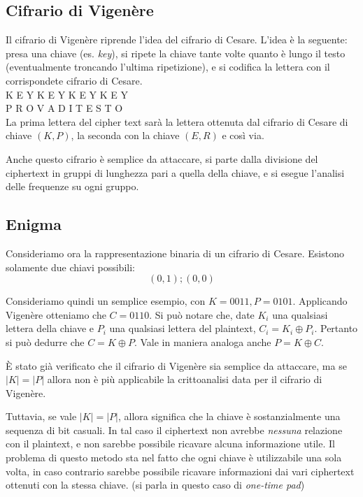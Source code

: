 \documentclass[a4paper, 11pt]{article}
\begin{document}
	\subsection{Cifrario di Vigenère}
	Il cifrario di Vigenère riprende l'idea del cifrario di Cesare. L'idea è la seguente: presa una chiave (es. \textit{key}), si ripete la chiave tante volte quanto è lungo il testo (eventualmente troncando l'ultima ripetizione), e si codifica la lettera con il corrispondete cifrario di Cesare. \\
	
	\noindent
	K E Y K E Y K E Y K E Y \\
	P R O V A D I T E S T O \\
	
	
	La prima lettera del cipher text sarà la lettera ottenuta dal cifrario di Cesare di chiave $(K,P)$, la seconda con la chiave $(E, R)$ e così via.
	
	Anche questo cifrario è semplice da attaccare, si parte dalla divisione del ciphertext in gruppi di lunghezza pari a quella della chiave, e si esegue l'analisi delle frequenze su ogni gruppo.
	
	\subsection{Enigma}
	Consideriamo ora la rappresentazione binaria di un cifrario di Cesare. Esistono solamente due chiavi possibili: \[ (0,1); (0,0) \]
	
	Consideriamo quindi un semplice esempio, con $K=0011, P=0101$. Applicando Vigenère otteniamo che $ C=0110$. Si può notare che, date $K_i$ una qualsiasi lettera della chiave e $P_i$ una qualsiasi lettera del plaintext, $C_i = K_i \oplus P_i$. Pertanto si può dedurre che $C=K\oplus P$. Vale in maniera analoga anche $P=K \oplus C$.
	
	È stato già verificato che il cifrario di Vigenère sia semplice da attaccare, ma se $|K| = |P|$ allora non è più applicabile la crittoanalisi data per il cifrario di Vigenère. 
	
	Tuttavia, se vale $|K| = |P|$, allora significa che la chiave è sostanzialmente una sequenza di bit casuali. In tal caso il ciphertext non avrebbe \textit{nessuna} relazione con il plaintext, e non sarebbe possibile ricavare alcuna informazione utile. Il problema di questo metodo sta nel fatto che ogni chiave è utilizzabile una sola volta, in caso contrario sarebbe possibile ricavare informazioni dai vari ciphertext ottenuti con la stessa chiave. (si parla in questo caso di \textit{one-time pad})
	
\end{document}
